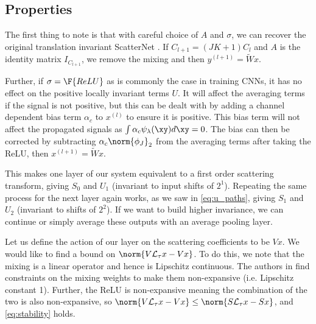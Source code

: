 \subsection{Properties}
The first thing to note is that with careful choice of $A$ and $\sigma$, we can
recover the original translation invariant ScatterNet
\cite{bruna_invariant_2013, oyallon_scaling_2017}. If $C_{l+1} = (JK+1)C_l$ 
and $A$ is the identity matrix $I_{C_{l+1}}$, we remove the mixing and then $y^{(l+1)} = \tilde{W}x$.

Further, if $\sigma = \F{ReLU}$ as is commonly the case in training CNNs, it has
no effect on the positive locally invariant terms $U$. It will affect the averaging terms
if the signal is not positive, but this can be dealt with by adding a channel
dependent bias term $\alpha_c$ to $x^{(l)}$ to ensure it is positive. This bias term
will not affect the propagated signals as $\int \alpha_c \psi_\lambda(\xy) d\xy =
0$. The bias can then be corrected by subtracting $\alpha_c \norm{\phi_J}_2$ from
the averaging terms after taking the ReLU, then $x^{(l+1)} = \tilde{W}x$.

This makes one layer of our system equivalent to a first order scattering
transform, giving $S_0$ and $U_1$ (invariant to input shifts of $2^1$). Repeating the
same process for the next layer again works, as we saw in \autoref{eq:u_paths},
giving $S_1$ and $U_2$ (invariant to shifts of $2^2$).  If we want to build
higher invariance, we can continue or simply average these outputs with an average pooling
layer.

Let us define the action of our layer on the scattering
coefficients to be $Vx$. We would like to find a bound on $\norm{V\mathcal{L}_\tau x -
V x}$. To do this, we note that the mixing is a linear operator and hence is
Lipschitz continuous. The authors in \cite{qiu_dcfnet:_2018} find constraints on the mixing
weights to make them non-expansive (i.e. Lipschitz constant 1).
Further, the ReLU is non-expansive meaning the combination of the two is
also non-expansive, so $\norm{V\mathcal{L}_\tau x - V x} \leq \norm{S\mathcal{L}_\tau
x - Sx}$, and \autoref{eq:stability} holds.


